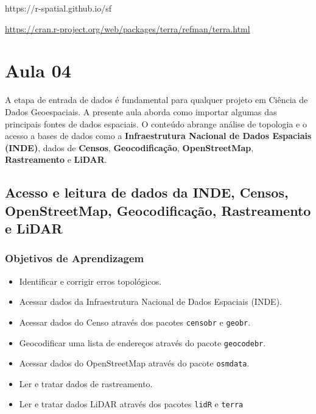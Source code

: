 \documentclass[
  letterpaper,
  DIV=11,
  numbers=noendperiod]{scrreprt}
\begin{document}
https://r-spatial.github.io/sf

\url{https://cran.r-project.org/web/packages/terra/refman/terra.html}


\chapter{Aula 04}\label{aula-04}

A etapa de entrada de dados é fundamental para qualquer projeto em
Ciência de Dados Geoespaciais. A presente aula aborda como importar
algumas das principais fontes de dados espaciais. O conteúdo abrange
análise de topologia e o acesso a bases de dados como a
\textbf{Infraestrutura Nacional de Dados Espaciais (INDE)}, dados de
\textbf{Censos}, \textbf{Geocodificação}, \textbf{OpenStreetMap},
\textbf{Rastreamento} e \textbf{LiDAR}.

\section{\texorpdfstring{\textbf{Acesso e leitura de dados da INDE,
Censos, OpenStreetMap, Geocodificação, Rastreamento e
LiDAR}}{Acesso e leitura de dados da INDE, Censos, OpenStreetMap, Geocodificação, Rastreamento e LiDAR}}\label{acesso-e-leitura-de-dados-da-inde-censos-openstreetmap-geocodificauxe7uxe3o-rastreamento-e-lidar}

\subsection{\texorpdfstring{\textbf{Objetivos de
Aprendizagem}}{Objetivos de Aprendizagem}}\label{objetivos-de-aprendizagem-2}

\begin{itemize}
\item
  Identificar e corrigir erros topológicos.
\item
  Acessar dados da Infraestrutura Nacional de Dados Espaciais (INDE).
\item
  Acessar dados do Censo através dos pacotes \texttt{censobr} e
  \texttt{geobr}.
\item
  Geocodificar uma lista de endereços através do pacote
  \texttt{geocodebr}.
\item
  Acessar dados do OpenStreetMap através do pacote \texttt{osmdata}.
\item
  Ler e tratar dados de rastreamento.
\item
  Ler e tratar dados LiDAR através dos pacotes \texttt{lidR} e
  \texttt{terra}
\end{itemize}
\end{document}
